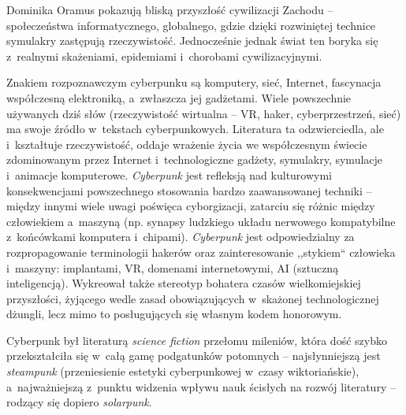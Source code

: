 \begin{artplenv}{Dominika Oramus}
pokazują bliską przyszłość cywilizacji Zachodu -- społeczeństwa informatycznego, globalnego, gdzie dzięki rozwiniętej technice symulakry zastępują rzeczywistość. Jednocześnie jednak świat ten boryka się z~realnymi skażeniami, epidemiami i~chorobami cywilizacyjnymi.

Znakiem rozpoznawczym cyberpunku są komputery, sieć, Internet, fascynacja współczesną elektroniką, a~zwłaszcza jej gadżetami. Wiele powszechnie używanych dziś słów (rzeczywistość wirtualna -- VR, haker, cyberprzestrzeń, sieć) ma swoje źródło w~tekstach cyberpunkowych. Literatura ta odzwierciedla, ale i~kształtuje rzeczywistość, oddaje wrażenie życia we współczesnym świecie zdominowanym przez Internet i~technologiczne gadżety, symulakry, symulacje i~animacje komputerowe. \textit{Cyberpunk} jest refleksją nad kulturowymi konsekwencjami powszechnego stosowania bardzo zaawansowanej techniki -- między innymi wiele uwagi poświęca cyborgizacji, zatarciu się różnic między człowiekiem a~maszyną (np. synapsy ludzkiego układu nerwowego kompatybilne z~końcówkami komputera i~chipami). \textit{Cyberpunk} jest odpowiedzialny za rozpropagowanie terminologii hakerów oraz zainteresowanie ,,stykiem`` człowieka i~maszyny: implantami, VR, domenami internetowymi, AI (sztuczną inteligencją). Wykreował także stereotyp bohatera czasów wielkomiejskiej przyszłości, żyjącego wedle zasad obowiązujących w~skażonej technologicznej dżungli, lecz mimo to posługujących się własnym kodem honorowym.

Cyberpunk był literaturą \textit{science fiction} przełomu mileniów, która dość szybko przekształciła się w~całą gamę podgatunków potomnych -- najsłynniejszą jest \textit{steampunk} (przeniesienie estetyki cyberpunkowej w~czasy wiktoriańskie), a~najważniejszą z~punktu widzenia wpływu nauk ścisłych na rozwój literatury -- rodzący się dopiero \textit{solarpunk}.


\end{artplenv}
